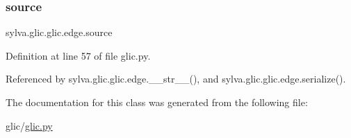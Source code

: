 \subsubsection{\texorpdfstring{source}{source}}
{\footnotesize\ttfamily sylva.\+glic.\+glic.\+edge.\+source}



Definition at line 57 of file glic.\+py.



Referenced by sylva.\+glic.\+glic.\+edge.\+\_\+\+\_\+str\+\_\+\+\_\+(), and sylva.\+glic.\+glic.\+edge.\+serialize().



The documentation for this class was generated from the following file\+:\begin{DoxyCompactItemize}
\item 
glic/\hyperlink{glic_8py}{glic.\+py}\end{DoxyCompactItemize}
